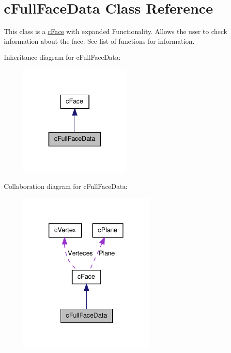 \hypertarget{classc_full_face_data}{
\section{cFullFaceData Class Reference}
\label{classc_full_face_data}
}


This class is a \hyperlink{classc_face}{cFace} with expanded Functionality. Allows the user to check information about the face. See list of functions for information.  




Inheritance diagram for cFullFaceData:
\nopagebreak
\begin{figure}[H]
\begin{center}
\leavevmode
\includegraphics[width=160pt]{classc_full_face_data__inherit__graph}
\end{center}
\end{figure}


Collaboration diagram for cFullFaceData:
\nopagebreak
\begin{figure}[H]
\begin{center}
\leavevmode
\includegraphics[width=194pt]{classc_full_face_data__coll__graph}
\end{center}
\end{figure}
